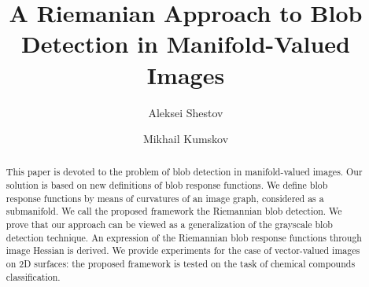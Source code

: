 \documentclass{llncs}
\begin{document}
\title{A Riemanian Approach to Blob Detection in Manifold-Valued Images}%

\author{Aleksei Shestov \and Mikhail Kumskov} 

\maketitle              %

\begin{abstract}
%
This paper is devoted to the problem of blob detection in manifold-valued images. Our solution is based on new definitions of blob response functions. We define blob response functions by means of curvatures of an image graph, considered as a submanifold. We call the proposed framework the Riemannian blob detection. We prove that our approach can be viewed as a generalization of the grayscale blob detection technique. An expression of the Riemannian blob response functions through image Hessian is derived. We provide experiments for the case of vector-valued images on 2D surfaces: the proposed framework is tested on the task of chemical compounds classification.
 \end{abstract}  
%
\end{document}

